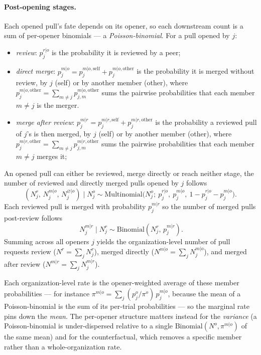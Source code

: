 \documentclass[12pt,notitlepage]{article}
\begin{document}
\paragraph{Post-opening stages.}
Each opened pull's fate depends on its opener, so each downstream count is a sum of per-opener binomials --- a \emph{Poisson-binomial}. For a pull opened by $j$:
\begin{itemize}
  \item \emph{review}: $p_j^{r|o}$ is the probability it is reviewed by a peer;
  \item \emph{direct merge}: $p_j^{m|o} = p_j^{m|o,\mathrm{self}} + p_j^{m|o,\mathrm{other}}$ is the probability it is merged without review, by $j$ (self) or by another member (other), where $p_j^{m|o,\mathrm{other}} = \sum_{m\neq j} p_{j,m}^{m|o,\mathrm{other}}$ sums the pairwise probabilities that each member $m\neq j$ is the merger. 
  \item \emph{merge after review}: $p_j^{m|r} = p_j^{m|r,\mathrm{self}} + p_j^{m|r,\mathrm{other}}$ is the probability a reviewed pull of $j$'s is then merged, by $j$ (self) or by another member (other), where $p_j^{m|r,\mathrm{other}} = \sum_{m\neq j} p_{j,m}^{m|r,\mathrm{other}}$ sums the pairwise probabilities that each member $m\neq j$ merges it;
\end{itemize}
An opened pull can either be reviewed, merge directly or reach neither stage, the number of reviewed and directly merged pulls opened by $j$ follows
\[ (N_j^r,\, N_j^{m|o},\, N_j^{\varnothing|o}) \mid N_j^o \sim \text{Multinomial}\bigl(N_j^o;\ p_j^{r|o},\ p_j^{m|o},\ 1-p_j^{r|o}-p_j^{m|o}\bigr). \]
Each reviewed pull is merged with probability $p_j^{m|r}$ so the number of merged pulls post-review follows 
\[\ N_j^{m|r} \mid N_j^r \sim \text{Binomial}(N_j^r,\, p_j^{m|r}). \]
Summing across all openers $j$ yields the organization-level number of pull requests review ($N^r=\sum_j N_j^r$), merged directly ($N^{m|o}=\sum_j N_j^{m|o}$), and merged after review ($N^{m|r}=\sum_j N_j^{m|r}$).

Each organization-level rate is the opener-weighted average of these member probabilities --- for instance $\pi^{m|o} = \sum_j (p_j^o/\pi^o)\,p_j^{m|o}$, because the mean of a Poisson-binomial is the sum of its per-trial probabilities --- so the marginal rate pins down the \emph{mean}.
The per-opener structure matters instead for the \emph{variance} (a Poisson-binomial is under-dispersed relative to a single $\text{Binomial}(N^o,\pi^{m|o})$ of the same mean) and for the counterfactual, which removes a specific member rather than a whole-organization rate.
\end{document}
